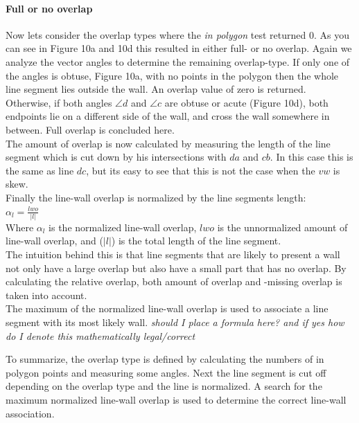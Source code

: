 \documentclass[10pt]{article}
\begin{document}
	\paragraph{Full or no overlap}
	Now lets consider the overlap types where the \emph{in polygon} test
	returned 0.
	As you can see in Figure 10a and 10d this resulted in either full- or no overlap.
	Again we analyze the vector angles to determine the remaining overlap-type.
	If only one of the angles is obtuse, Figure 10a, with no points in the polygon 
	then the whole line segment lies outside the wall. An overlap value of zero
	is returned.\\
	Otherwise, if both angles $\angle d$ and $\angle c$ are obtuse or acute (Figure 10d),
	both endpoints lie on a different side of the wall, and cross the wall somewhere in
	between. Full overlap is concluded here. \\
	The amount of overlap is now calculated by measuring the length
	of the line segment which is cut down by his intersections with $da$ and
	$cb$. In this case this is the same as line $dc$, but its easy to see that
	this is not the case when the $vw$ is skew.\\
	
	Finally the line-wall overlap is normalized by the line segments length:\\
	$\alpha_l = \frac{lwo}{|l|}$\\
	Where $\alpha_l$ is the normalized line-wall overlap, $lwo$ is the unnormalized
	amount of line-wall overlap, and ($|l|$) is the total length of the line
	segment.\\

	The intuition behind this is that line segments that are likely to
	present a wall not only have a large overlap but also have a small part
	that has no overlap. By calculating the relative overlap, both amount of overlap
	and -missing overlap is taken into account.\\

	The maximum of the normalized line-wall overlap is used to associate a
	line segment with its most likely wall.
	\emph{should I place a formula here? and if yes how do I denote this
	mathematically legal/correct}

	To summarize, the overlap type is defined by calculating the numbers of in
	polygon points and measuring some angles. Next the line segment is cut off
	depending on the overlap type and the line is normalized. A search for the
	maximum normalized line-wall overlap is used to determine the correct line-wall
	association.
\end{document}
